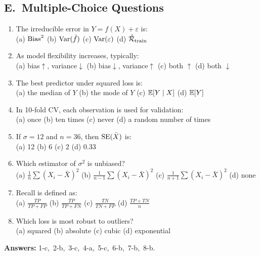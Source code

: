 \subsection*{E.\ Multiple-Choice Questions}
\begin{enumerate}
  \item The irreducible error in $Y=f(X)+\varepsilon$ is: \\
  (a) $\operatorname{Bias}^2$ \quad (b) $\operatorname{Var}(\hat f)$ \quad (c) $\operatorname{Var}(\varepsilon)$ \quad (d) $\hat{\mathcal{R}}_{\text{train}}$
  \item As model flexibility increases, typically: \\
  (a) bias$\uparrow$, variance$\downarrow$ \quad (b) bias$\downarrow$, variance$\uparrow$ \quad (c) both $\uparrow$ \quad (d) both $\downarrow$
  \item The best predictor under squared loss is: \\
  (a) the median of $Y$ \quad (b) the mode of $Y$ \quad (c) $\mathbb{E}[Y\mid X]$ \quad (d) $\mathbb{E}[Y]$
  \item In 10-fold CV, each observation is used for validation: \\
  (a) once \quad (b) ten times \quad (c) never \quad (d) a random number of times
  \item If $\sigma=12$ and $n=36$, then $\operatorname{SE}(\bar X)$ is: \\
  (a) 12 \quad (b) 6 \quad (c) 2 \quad (d) 0.33
  \item Which estimator of $\sigma^2$ is unbiased? \\
  (a) $\frac1n\sum(X_i-\bar X)^2$ \quad (b) $\frac1{n-1}\sum(X_i-\bar X)^2$ \quad (c) $\frac1{n+1}\sum(X_i-\bar X)^2$ \quad (d) none
  \item Recall is defined as: \\
  (a) $\frac{TP}{TP+FP}$ \quad (b) $\frac{TP}{TP+FN}$ \quad (c) $\frac{TN}{TN+FP}$ \quad (d) $\frac{TP+TN}{n}$
  \item Which loss is most robust to outliers? \\
  (a) squared \quad (b) absolute \quad (c) cubic \quad (d) exponential
\end{enumerate}
\textbf{Answers:} 1-c,\ 2-b,\ 3-c,\ 4-a,\ 5-c,\ 6-b,\ 7-b,\ 8-b.

